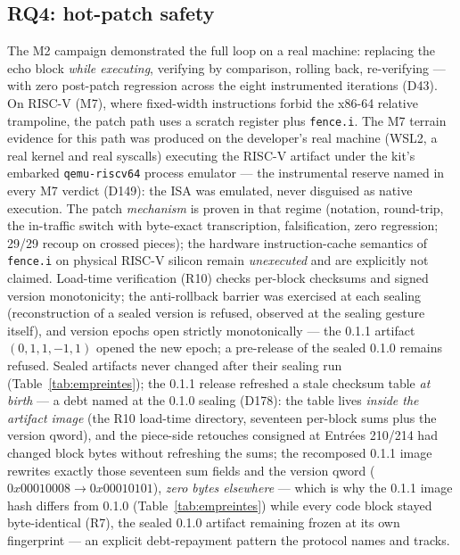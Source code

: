 \documentclass[10pt,a4paper]{article}
\newcommand{\code}[1]{\texttt{\small #1}}
\begin{document}
\subsection{RQ4: hot-patch safety}\label{sec:rq4}

The M2 campaign demonstrated the full loop on a real machine: replacing
the echo block \emph{while executing}, verifying by comparison,
rolling back, re-verifying --- with zero post-patch regression across the
eight instrumented iterations (D43). On RISC-V (M7), where fixed-width
instructions forbid the x86-64 relative trampoline, the patch path uses
a scratch register plus \code{fence.i}. The M7 terrain evidence for this
path was produced on the developer's real machine (WSL2, a real kernel
and real syscalls) executing the RISC-V artifact under the kit's
embarked \code{qemu-riscv64} process emulator --- the instrumental
reserve named in every M7 verdict (D149): the ISA was emulated, never
disguised as native execution. The patch \emph{mechanism} is proven in
that regime (notation, round-trip, the in-traffic switch with byte-exact
transcription, falsification, zero regression; 29/29 recoup on crossed
pieces); the hardware instruction-cache semantics of \code{fence.i} on
physical RISC-V silicon remain \emph{unexecuted} and are explicitly not
claimed. Load-time verification (R10)
checks per-block checksums and signed version monotonicity; the
anti-rollback barrier was exercised at each sealing (reconstruction of a
sealed version is refused, observed at the sealing gesture itself), and
version epochs open strictly monotonically --- the 0.1.1 artifact
$(0,1,1,-1,1)$ opened the new epoch; a pre-release of the sealed 0.1.0
remains refused. Sealed artifacts never changed after their sealing run
(Table~\ref{tab:empreintes}); the 0.1.1 release refreshed a stale
checksum table \emph{at birth} --- a debt named at the 0.1.0 sealing
(D178): the table lives \emph{inside the artifact image} (the R10
load-time directory, seventeen per-block sums plus the version qword),
and the piece-side retouches consigned at Entr\'ees 210/214 had changed
block bytes without refreshing the sums; the recomposed 0.1.1 image
rewrites exactly those seventeen sum fields and the version qword
($0x00010008 \to 0x00010101$), \emph{zero bytes elsewhere} --- which
is why the 0.1.1 image hash differs from 0.1.0
(Table~\ref{tab:empreintes}) while every code block stayed byte-identical
(R7), the sealed 0.1.0 artifact remaining frozen at its own fingerprint
--- an explicit debt-repayment pattern the protocol names and tracks.
\end{document}
